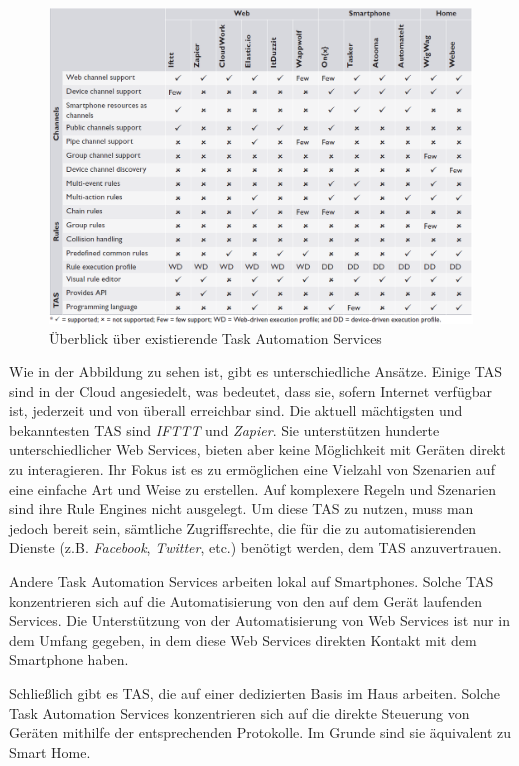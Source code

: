 \begin{figure}[h]
	\centering
	\includegraphics[width=\textwidth]{bilder/TASOverview}
	\caption{Überblick über existierende Task Automation Services \cite{ieee:tas}}
	\label{fig:tasoverview}
\end{figure}

Wie in der Abbildung zu sehen ist, gibt es unterschiedliche Ansätze. Einige TAS sind in der Cloud angesiedelt, was bedeutet, dass sie, sofern Internet verfügbar ist, jederzeit und von überall erreichbar sind. Die aktuell mächtigsten und bekanntesten TAS sind \textit{IFTTT} \cite{IFTTT} und \textit{Zapier}\cite{Zapier}. Sie unterstützen hunderte unterschiedlicher Web Services, bieten aber keine Möglichkeit mit Geräten direkt zu interagieren. Ihr Fokus ist es zu ermöglichen eine Vielzahl von Szenarien auf eine einfache Art und Weise zu erstellen. Auf komplexere Regeln und Szenarien sind ihre Rule Engines nicht ausgelegt. 
Um diese TAS zu nutzen, muss man jedoch bereit sein, sämtliche Zugriffsrechte, die für die zu automatisierenden Dienste (z.B. \textit{Facebook}, \textit{Twitter}, etc.) benötigt werden, dem TAS anzuvertrauen.

Andere Task Automation Services arbeiten lokal auf Smartphones. Solche TAS konzentrieren sich auf die Automatisierung von den auf dem Gerät laufenden Services. Die Unterstützung von der Automatisierung von Web Services ist nur in dem Umfang gegeben, in dem diese Web Services direkten Kontakt mit dem Smartphone haben.  

Schließlich gibt es TAS, die auf einer dedizierten Basis im Haus arbeiten. Solche Task Automation Services konzentrieren sich auf die direkte Steuerung von Geräten mithilfe der entsprechenden Protokolle. Im Grunde sind sie äquivalent zu Smart Home. 

